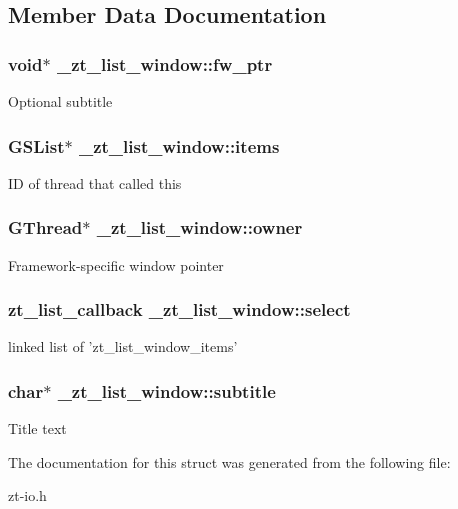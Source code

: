 \subsection{Member Data Documentation}
\hypertarget{struct__zt__list__window_aec269353bfb6e2db7a1fa17cb9e5635b}{
\subsubsection[{fw\-\_\-ptr}]{\setlength{\rightskip}{0pt plus 5cm}void$\ast$ \-\_\-zt\-\_\-list\-\_\-window\-::fw\-\_\-ptr}}\label{struct__zt__list__window_aec269353bfb6e2db7a1fa17cb9e5635b}
Optional subtitle \hypertarget{struct__zt__list__window_a73b3993928a8c0e9669f4a547e0bb1f4}{
\subsubsection[{items}]{\setlength{\rightskip}{0pt plus 5cm}G\-S\-List$\ast$ \-\_\-zt\-\_\-list\-\_\-window\-::items}}\label{struct__zt__list__window_a73b3993928a8c0e9669f4a547e0bb1f4}
I\-D of thread that called this \hypertarget{struct__zt__list__window_ac035ebdcaffbbd822e25b6c57853987c}{
\subsubsection[{owner}]{\setlength{\rightskip}{0pt plus 5cm}G\-Thread$\ast$ \-\_\-zt\-\_\-list\-\_\-window\-::owner}}\label{struct__zt__list__window_ac035ebdcaffbbd822e25b6c57853987c}
Framework-\/specific window pointer \hypertarget{struct__zt__list__window_ad05058c977ef71bd963ccb5e95d3d527}{
\subsubsection[{select}]{\setlength{\rightskip}{0pt plus 5cm}zt\-\_\-list\-\_\-callback \-\_\-zt\-\_\-list\-\_\-window\-::select}}\label{struct__zt__list__window_ad05058c977ef71bd963ccb5e95d3d527}
linked list of 'zt\-\_\-list\-\_\-window\-\_\-items' \hypertarget{struct__zt__list__window_a395256e9302e9a5f0391087993a1c54a}{
\subsubsection[{subtitle}]{\setlength{\rightskip}{0pt plus 5cm}char$\ast$ \-\_\-zt\-\_\-list\-\_\-window\-::subtitle}}\label{struct__zt__list__window_a395256e9302e9a5f0391087993a1c54a}
Title text 

The documentation for this struct was generated from the following file\-:\begin{DoxyCompactItemize}
\item 
zt-\/io.\-h\end{DoxyCompactItemize}
